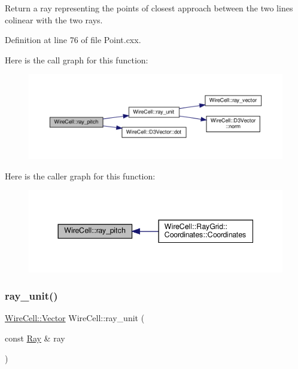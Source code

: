 Return a ray representing the points of closest approach between the two lines colinear with the two rays. 

Definition at line 76 of file Point.\+cxx.

Here is the call graph for this function\+:
\nopagebreak
\begin{figure}[H]
\begin{center}
\leavevmode
\includegraphics[width=350pt]{namespace_wire_cell_a8e3ed293f3eefafaec9f8cf97f460a9b_cgraph}
\end{center}
\end{figure}
Here is the caller graph for this function\+:
\nopagebreak
\begin{figure}[H]
\begin{center}
\leavevmode
\includegraphics[width=344pt]{namespace_wire_cell_a8e3ed293f3eefafaec9f8cf97f460a9b_icgraph}
\end{center}
\end{figure}
\mbox{\label{namespace_wire_cell_a15976410f167da6dd279a8facf3218df}} 
\subsubsection{\texorpdfstring{ray\+\_\+unit()}{ray\_unit()}}
{\footnotesize\ttfamily \hyperlink{namespace_wire_cell_aa3c82d3ba85f032b0d278b7004846800}{Wire\+Cell\+::\+Vector} Wire\+Cell\+::ray\+\_\+unit (\begin{DoxyParamCaption}\item[{const \hyperlink{namespace_wire_cell_a3ab20d9b438feb7eb1ffaab9ba98af0c}{Ray} \&}]{ray }\end{DoxyParamCaption})}

